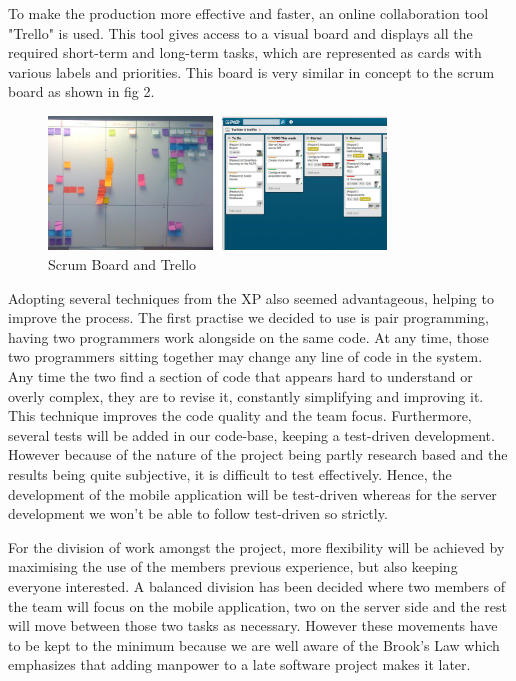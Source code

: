 To make the production more effective and faster, an online collaboration tool
"Trello" is used. This tool gives access to a visual board and displays all the
required short-term and long-term tasks, which are represented as cards with
various labels and priorities. This board is very similar in concept to the
scrum board as shown in fig 2.

\begin{figure}[here]
\begin{minipage}{\textwidth}
\begin{center}
\includegraphics[width=0.8\textwidth]{images/scrumboard.jpg}
\end{center}
\vspace{-20pt}
\caption[Caption for LOF]{Scrum Board and Trello\footnotemark}
\end{minipage} 
\end{figure}


Adopting several techniques from the XP also seemed advantageous, helping to
improve the process. The first practise we decided to use is pair programming,
having two programmers work alongside on the same code. At any time, those two
programmers sitting together may change any line of code in the system. Any
time the two find a section of code that appears hard to understand or overly
complex, they are to revise it, constantly simplifying and improving it. This
technique improves the code quality and the team focus. Furthermore, several
tests will be added in our code-base, keeping a test-driven development.
However because of the nature of the project being partly research based and
the results being quite subjective, it is difficult to test effectively. Hence,
the development of the mobile application will be test-driven whereas for the
server development we won't be able to follow test-driven so strictly.\cite{Cockburn}

For the division of work amongst the project, more flexibility will be achieved by maximising the use of the members previous experience, but also keeping everyone interested. A balanced division has been decided where two members of the team will focus on the mobile application, two on the server side and the rest will move between those two tasks as necessary. However these movements have to be kept to the minimum because we are well aware of the Brook's Law which emphasizes that adding manpower to a late software project makes it later.\cite{Brooks}

